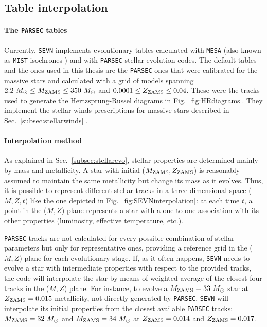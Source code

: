 \documentclass[a4paper,titlepage]{book}     	%
\newcommand{\sun}{\ensuremath{_\odot}}
\newcommand{\mzams}{M_\textup{ZAMS}}
\newcommand{\zzams}{Z_\textup{ZAMS}}
\newcommand{\msun}{\ensuremath{M\sun}}
\begin{document}
\subsection{Table interpolation}\label{subsec:interpolationSEVN}
\paragraph{The \texttt{PARSEC} tables} Currently, \texttt{SEVN} implements evolutionary tables calculated with \texttt{MESA} (also known as \texttt{MIST} isochrones \cite{MIST_Choi2016}) and with \texttt{PARSEC} \cite{parsec2015_chen} stellar evolution codes. The default tables and the ones used in this thesis are the \texttt{PARSEC} ones that were calibrated for the massive stars and calculated with a grid of models spanning $2.2~\msun \leq \mzams \leq 350~\msun$ and $0.0001 \leq \zzams \leq 0.04$. These were the tracks used to generate the Hertzsprung-Russel diagrams in Fig.\ \ref{fig:HRdiagrams}. They implement the stellar winds prescriptions for massive stars described in Sec.\ \ref{subsec:stellarwinds} \cite{parsec2015_chen}. 

\paragraph{Interpolation method} As explained in Sec.\ \ref{subsec:stellarevo}, stellar properties are determined mainly by mass and metallicity. A star with initial ($\mzams,\zzams$) is reasonably assumed to maintain the same metallicity but change its mass as it evolves. Thus, it is possible to represent different stellar tracks in a three-dimensional space ($M,Z,t$) like the one depicted in Fig.\ \ref{fig:SEVNinterpolation}: at each time $t$, a point in the ($M,Z$) plane represents a star with a one-to-one association with its other properties (luminosity, effective temperature, etc.).

\texttt{PARSEC} tracks are not calculated for every possible combination of stellar parameters but only for representative ones, providing a reference grid in the ($M,Z$) plane for each evolutionary stage. If, as it often happens, \texttt{SEVN} needs to evolve a star with intermediate properties with respect to the provided tracks, the code will interpolate the star by means of weighted average of the closest four tracks in the ($M,Z$) plane. For instance, to evolve a $\mzams = 33~\msun$ star at $\zzams=0.015$ metallicity, not directly generated by \texttt{PARSEC}, \texttt{SEVN} will interpolate its initial properties from the closest available \texttt{PARSEC} tracks: $\mzams = 32~\msun$ and $\mzams = 34~\msun$ at $\zzams = 0.014$ and $\zzams = 0.017$.
\end{document}
